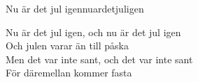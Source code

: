 \begin{song}{Nu är det jul igen}{nuardetjuligen}
\begin{vers}
\repopen Nu är det jul igen, och nu är det jul igen\\
Och julen varar än till påska \repclose\\
\repopen Men det var inte sant, och det var inte sant\\
För däremellan kommer fasta \repclose\\
\end{vers}
\end{song}
